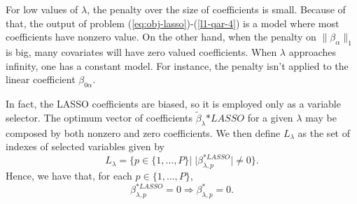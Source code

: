 
For low values of $\lambda$, the penalty over the size of coefficients is small. Because of that, the output of problem (\ref{eq:obj-lasso})-(\ref{l1-qar-4}) is a model where most coefficients have nonzero value. On the other hand, when the penalty on $\| \beta_\alpha \|_1$ is big, many covariates will have zero valued coefficients. When $\lambda$ approaches infinity, one has a constant model. 
For instance, the penalty isn't applied to the linear coefficient $\beta_{0\alpha}$. 

In fact, the LASSO coefficients are biased, so it is employed only as a variable selector. 
The optimum vector of coefficients $\tilde \beta_\lambda{*LASSO}$ for a given $\lambda$ may be composed by both nonzero and zero coefficients. 
We then define $L_\lambda$ as the set of indexes of selected variables given by
\begin{equation*}
L_\lambda = \{ p \in \{ 1,\dots,P \} | \; |\beta^{*LASSO}_{\lambda,p}| \neq 0  \}.
\end{equation*}
Hence, we have that, for each $p \in \{ 1,\dots,P \}$,
$$\beta^{*LASSO}_{\lambda,p} = 0 \Longrightarrow \beta^{*}_{\lambda,p} = 0.$$

